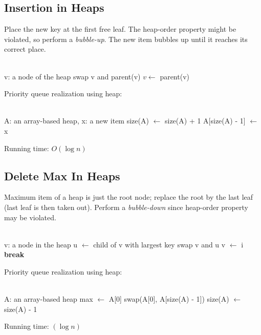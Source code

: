 \documentclass[12pt]{article}
\theoremstyle{definition}
\begin{document}
\subsection{Insertion in Heaps}
Place the new key at the first free leaf.
The heap-order property might be violated, so perform a \emph{bubble-up}.
The new item bubbles up until it reaches its correct place.
\begin{algorithmic}
   \\
  v: a node of the heap
    \State swap v and parent(v)
    \State $v \leftarrow$ parent(v)
  \EndWhile
  \EndFunction
\end{algorithmic}
Priority queue realization using heap:
\begin{algorithmic}
   \\
  A: an array-based heap, x: a new item
  \State size(A) $\leftarrow$ size(A) + 1
  \State A[size(A) - 1] $\leftarrow$ x
  \State {}
  \EndFunction
\end{algorithmic}
Running time: $O(\log n)$ \\

\subsection{Delete Max In Heaps}
Maximum item of a heap is just the root node; replace the root by the last leaf (last leaf is then taken out).
Perform a \emph{bubble-down} since heap-order property may be violated.
\begin{algorithmic}
   \\
  v: a node in the heap
    \State u $\leftarrow$ child of v with largest key
      \State swap v and u
      \State v $\leftarrow$ i
    \Else
      \State \textbf{break}
    \EndIf
  \EndWhile
  \EndFunction
\end{algorithmic}
Priority queue realization using heap:
\begin{algorithmic}
   \\
  A: an array-based heap
  \State max $\leftarrow$ A[0]
  \State swap(A[0], A[size(A) - 1])
  \State size(A) $\leftarrow$ size(A) - 1
  \State {}
  \State {}
  \EndFunction
\end{algorithmic}
Running time: $(\log n)$
\end{document}
